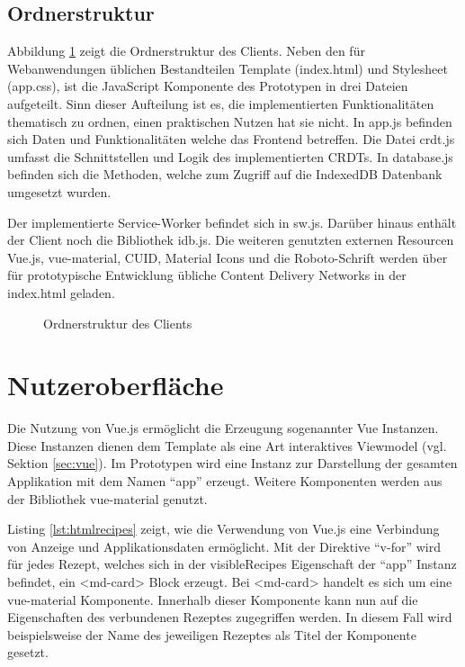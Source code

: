 \documentclass[a4paper, 12pt]{scrreprt}
\begin{document}
\subsection{Ordnerstruktur}

Abbildung \ref{fig:ordnerstruktur} zeigt die Ordnerstruktur des Clients. Neben den für Webanwendungen üblichen Bestandteilen Template (index.html) und Stylesheet (app.css), ist die JavaScript Komponente des Prototypen in drei Dateien aufgeteilt. Sinn dieser Aufteilung ist es, die implementierten Funktionalitäten thematisch zu ordnen, einen praktischen Nutzen hat sie nicht. In app.js befinden sich Daten und Funktionalitäten welche das Frontend betreffen. Die Datei crdt.js umfasst die Schnittstellen und Logik des implementierten CRDTs. In database.js befinden sich die Methoden, welche zum Zugriff auf die IndexedDB Datenbank umgesetzt wurden. 

Der implementierte Service-Worker befindet sich in sw.js. Darüber hinaus enthält der Client noch die Bibliothek idb.js. Die weiteren genutzten externen Resourcen Vue.js, vue-material, CUID, Material Icons und die Roboto-Schrift werden über für prototypische Entwicklung übliche Content Delivery Networks in der index.html geladen.

\begin{figure}[H]
	\centering
	\begin{minipage}{.3\textwidth}
	\end{minipage}
	\caption{Ordnerstruktur des Clients}
	\label{fig:ordnerstruktur}
\end{figure}

	
\section{Nutzeroberfläche}

Die Nutzung von Vue.js ermöglicht die Erzeugung sogenannter Vue Instanzen. Diese Instanzen dienen dem Template als eine Art interaktives Viewmodel (vgl. Sektion \ref{sec:vue}). Im Prototypen wird eine Instanz zur Darstellung der gesamten Applikation mit dem Namen \enquote{app} erzeugt. Weitere Komponenten werden aus der Bibliothek vue-material genutzt.

Listing \ref{lst:htmlrecipes} zeigt, wie die Verwendung von Vue.js eine Verbindung von Anzeige und Applikationsdaten ermöglicht. Mit der Direktive \enquote{v-for} wird für jedes Rezept, welches sich in der visibleRecipes Eigenschaft der \enquote{app} Instanz befindet, ein <md-card> Block erzeugt. Bei <md-card> handelt es sich um eine vue-material Komponente. Innerhalb dieser Komponente kann nun auf die Eigenschaften des verbundenen Rezeptes zugegriffen werden. In diesem Fall wird beispielsweise der Name des jeweiligen Rezeptes als Titel der Komponente gesetzt.
\end{document}
